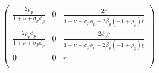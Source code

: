 \documentclass{article}
\begin{document}
\[\left(
\begin{array}{ccc}
 \frac{2 \rho _p}{1+\nu +\sigma _p \phi _p} & 0 & \frac{2 \underline{r}}{1+\nu +\sigma _p \phi _p+2 \beta _p \left(-1+\rho _p\right) \underline{r}}
\\
 \frac{2 \rho _p \phi _p}{1+\nu +\sigma _p \phi _p} & 0 & \frac{2 \phi _p \underline{r}}{1+\nu +\sigma _p \phi _p+2 \beta _p \left(-1+\rho _p\right)
\underline{r}} \\
 0 & 0 & \underline{r} \\
\end{array}
\right)\]
\end{document}
